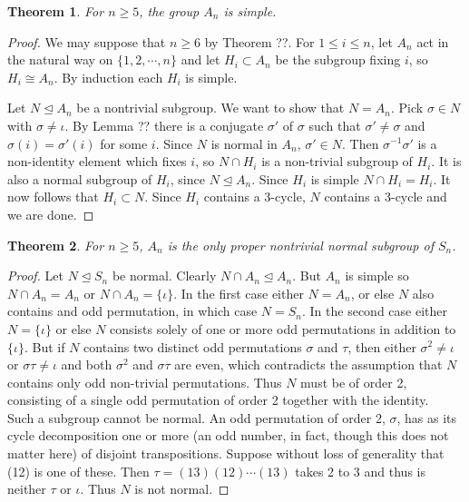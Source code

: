 \documentclass[a4paper,10pt]{article}
\newtheorem{theorem}{Theorem}
\begin{document}
\begin{theorem}
For $n\geq 5$, the group $A_n$ is simple. 
\end{theorem}
\begin{proof}
We may suppose that $n \geq 6$ by Theorem ??. For $1 \leq i\leq n$, let $A_n$ act in the natural way on $\{1, 2, \cdots,n\}$ and let $H_i\subset A_n$ be the subgroup fixing $i$, so $H_i \cong A_n$. By induction each $H_i$ is simple.

Let $N \unlhd A_n$ be a nontrivial subgroup. We want to show that $N=A_n$. Pick $\sigma \in N$ with $\sigma \neq \iota$. By Lemma ?? there is a conjugate $\sigma'$ of $\sigma$ such that $\sigma' \neq \sigma$ and $\sigma(i)=\sigma'(i)$ for some $i$. Since $N$ is normal in $A_n$, $\sigma' \in N$. Then $\sigma^{-1}\sigma'$ is a non-identity element which fixes $i$, so $N \cap H_i$ is a non-trivial subgroup of $H_i$. It is also a normal subgroup of $H_i$, since $N \unlhd A_n$. Since $H_i$ is simple $N\cap H_i = H_i$. It now follows that $H_i \subset N$. Since $H_i$ contains a 3-cycle, $N$ contains a 3-cycle and we are done.
\end{proof}



\begin{theorem}
For $n \geq 5$, $A_n$ is the only proper nontrivial normal subgroup of $S_n$. 
\end{theorem}
\begin{proof}
Let $N \unlhd S_n$ be normal. Clearly $N\cap A_n \unlhd A_n$. But $A_n$ is simple so $N\cap A_n = A_n$ or $N\cap A_n = \{\iota\}$. In the first case either $N=A_n$, or else $N$ also contains and odd permutation, in which case $N=S_n$. In the second case either $N=\{\iota\}$ or else $N$ consists solely of one or more odd permutations in addition to $\{\iota\}$. But if $N$ contains two distinct odd permutations $\sigma$ and $\tau$, then either $\sigma^2 \neq \iota$ or $\sigma \tau \neq \iota$ and both $\sigma^2$ and $\sigma \tau$ are even, which contradicts the assumption that $N$ contains only odd non-trivial permutations. Thus $N$ must be of order 2, consisting of a single odd permutation of order 2 together with the identity. \\

Such a subgroup cannot be normal. An odd permutation of order 2, $\sigma$, has as its cycle decomposition one or more (an odd number, in fact, though this does not matter here) of disjoint transpositions. Suppose without loss of generality that (12) is one of these. Then $\tau = (13)(12)\cdots(13)$ takes 2 to 3 and thus is neither $\tau$ or $\iota$. Thus $N$ is not normal.
\end{proof}
\end{document}
